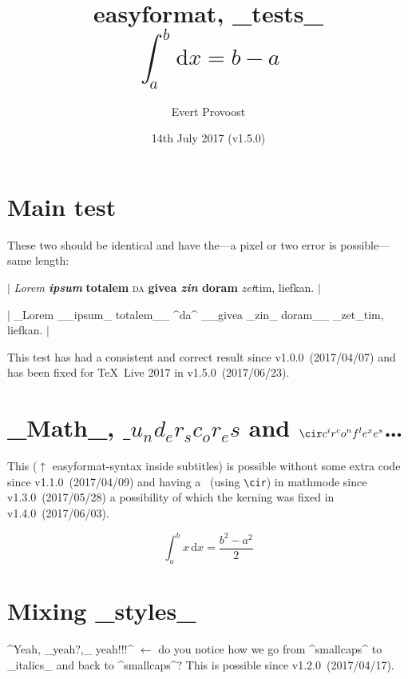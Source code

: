 \documentclass[11pt]{article}
\title{\textsf{easyformat}, _tests_\\$$ \int_a^b \mathrm{d}x = b - a $$}
\author{Evert Provoost}
\date{14th July 2017 (v1.5.0)}
\begin{document}
	\maketitle
	\tableofcontents

	\section{Main test}
	These two should be identical and have the---a pixel or two error is possible---same length:

	$|$ \textit{Lorem \textbf{ipsum}}\textbf{ totalem} \textsc{da} \textbf{givea \textit{zin} doram}
	\textit{zet}tim, liefkan. $|$\par

	$|$ _Lorem __ipsum_ totalem__ ^da^ __givea _zin_ doram__ _zet_tim, liefkan. $|$\par
	
	\noindent This test has had a consistent and correct result since v1.0.0~(2017/04/07) and has been fixed for \TeX~Live 2017 in v1.5.0~(2017/06/23).

	\section{_Math_, $\_ u_nd_er_sc_or_es$ and $\cir c^ir^co^nf^le^xe^s$\dots}
	This ($\uparrow$ \textsf{easyformat}-syntax inside subtitles) is possible without some extra code
	since v1.1.0~(2017/04/09) and having a \cir\ (using \verb|\cir|) in mathmode since
	v1.3.0~(2017/05/28) a possibility of which the kerning was fixed in v1.4.0~(2017/06/03).
	
	$$ \int_a^b x\,\mathrm{d}x = \frac{b^2 - a^2}{2} $$
	
	\section{Mixing _styles_}
	^Yeah, _yeah?,_ yeah!!!^
	$\leftarrow$ do you notice how we go from ^smallcaps^ to _italics_ and back to ^smallcaps^? This
	is possible since v1.2.0~(2017/04/17).
\end{document}
